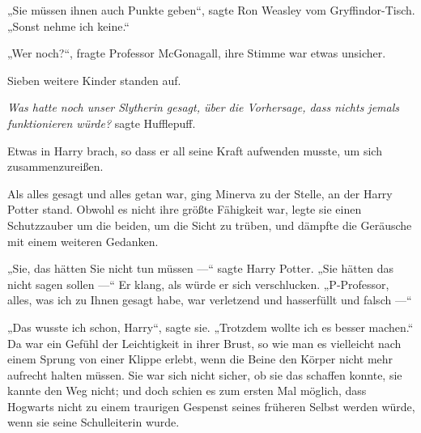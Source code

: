 „Sie müssen ihnen auch Punkte geben“, sagte Ron Weasley vom Gryffindor-Tisch.
„Sonst nehme ich keine.“

„Wer noch?“, fragte Professor McGonagall, ihre Stimme war etwas unsicher.

Sieben weitere Kinder standen auf.

\emph{Was hatte noch unser Slytherin gesagt, über die Vorhersage, dass nichts jemals funktionieren würde?} sagte Hufflepuff.

Etwas in Harry brach, so dass er all seine Kraft aufwenden musste, um sich zusammenzureißen.

\later

Als alles gesagt und alles getan war, ging Minerva zu der Stelle, an der Harry Potter stand. Obwohl es nicht ihre größte Fähigkeit war, legte sie einen Schutzzauber um die beiden, um die Sicht zu trüben, und dämpfte die Geräusche mit einem weiteren Gedanken.

„Sie, das hätten Sie nicht tun müssen —“ sagte Harry Potter.
„Sie hätten das nicht sagen sollen —“ Er klang, als würde er sich verschlucken.
„P-Professor, alles, was ich zu Ihnen gesagt habe, war verletzend und hasserfüllt und falsch —“

„Das wusste ich schon, Harry“, sagte sie.
„Trotzdem wollte ich es besser machen.“ Da war ein Gefühl der Leichtigkeit in ihrer Brust, so wie man es vielleicht nach einem Sprung von einer Klippe erlebt, wenn die Beine den Körper nicht mehr aufrecht halten müssen. Sie war sich nicht sicher, ob sie das schaffen konnte, sie kannte den Weg nicht; und doch schien es zum ersten Mal möglich, dass Hogwarts nicht zu einem traurigen Gespenst seines früheren Selbst werden würde, wenn sie seine Schulleiterin wurde.

